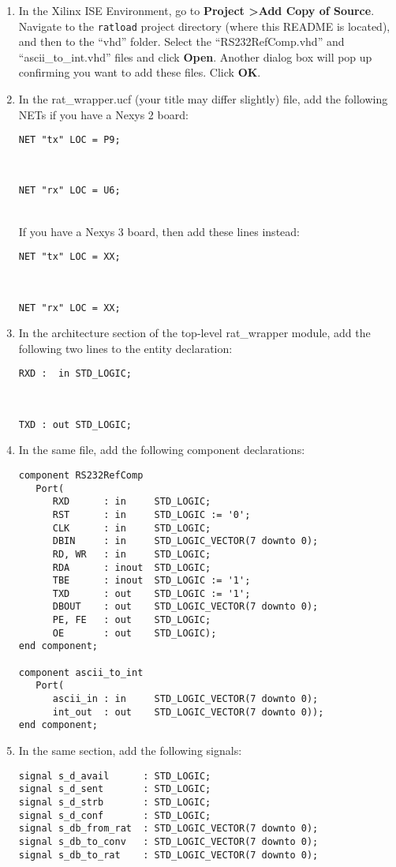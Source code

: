 \documentclass[notitlepage]{article}
\begin{document}
\begin {enumerate}
\item In the Xilinx ISE Environment, go to \textbf{Project \textgreater Add Copy of Source}. Navigate to the \texttt{ratload} project directory (where this README is located), and then to the ``vhd'' folder. Select the ``RS232RefComp.vhd'' and ``ascii\_to\_int.vhd'' files and click \textbf{Open}. Another dialog box will pop up confirming you want to add these files. Click \textbf{OK}.

\item In the rat\_wrapper.ucf (your title may differ slightly) file, add the following NETs if you have a Nexys 2 board:\\
\centerline{\texttt{NET "tx" LOC = P9;}}\\
\centerline{\texttt{NET "rx" LOC = U6;}}\\
If you have a Nexys 3 board, then add these lines instead:\\
\centerline{\texttt{NET "tx" LOC = XX;}}\\
\centerline{\texttt{NET "rx" LOC = XX;}}

\item In the architecture section of the top-level rat\_wrapper module, add the following two lines to the entity declaration:\\
\centerline{\texttt{RXD : ~in STD\_LOGIC;}}\\
\centerline{\texttt{TXD : out STD\_LOGIC;}}

\item In the same file, add the following component declarations:
\begin{verbatim}
component RS232RefComp
   Port(
      RXD      : in     STD_LOGIC;
      RST      : in     STD_LOGIC := '0';
      CLK      : in     STD_LOGIC;
      DBIN     : in     STD_LOGIC_VECTOR(7 downto 0);
      RD, WR   : in     STD_LOGIC;
      RDA      : inout  STD_LOGIC;
      TBE      : inout  STD_LOGIC := '1';
      TXD      : out    STD_LOGIC := '1';
      DBOUT    : out    STD_LOGIC_VECTOR(7 downto 0);
      PE, FE   : out    STD_LOGIC;
      OE       : out    STD_LOGIC);
end component;

component ascii_to_int
   Port(
      ascii_in : in     STD_LOGIC_VECTOR(7 downto 0);
      int_out  : out    STD_LOGIC_VECTOR(7 downto 0));
end component;
\end{verbatim}

\item In the same section, add the following signals:
\begin{verbatim}
signal s_d_avail      : STD_LOGIC;
signal s_d_sent       : STD_LOGIC;
signal s_d_strb       : STD_LOGIC;
signal s_d_conf       : STD_LOGIC;
signal s_db_from_rat  : STD_LOGIC_VECTOR(7 downto 0);
signal s_db_to_conv   : STD_LOGIC_VECTOR(7 downto 0);
signal s_db_to_rat    : STD_LOGIC_VECTOR(7 downto 0);
\end{verbatim}


\end{enumerate}
\end{document}
